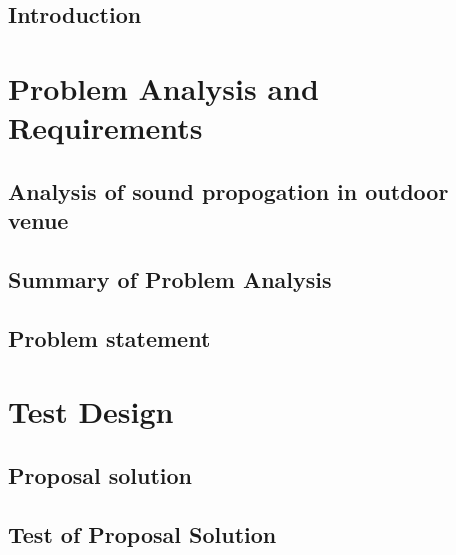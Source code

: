 \glsresetall


 \graphicspath{{figures/analysing/}}
\chapter{Introduction}\label{ch:intro}



\part{Problem Analysis and Requirements}\label{pt:analysis} \glsresetall
\graphicspath{{figures/analysis/}}
\chapter{Analysis of sound propogation in outdoor venue}\label{ch:analysis}
%




\chapter{Summary of Problem Analysis}\label{ch:analysis:summary}



\chapter{Problem statement}\label{ch:statement}




\part{Test Design}\label{pt:design} 
\graphicspath{{figures/design/}}	
%
\chapter{Proposal solution}

\chapter{Test of Proposal Solution}

